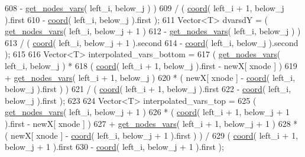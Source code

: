 \begin{DoxyCode}
608                               - \hyperlink{classLuna_1_1Mesh2D_ae91c7515960ecedf43e4ed3f411080a1}{get\_nodes\_vars}( left\_i, below\_j ) )
609                            / ( \hyperlink{classLuna_1_1Mesh2D_add4d12155922731ccf59fe4454699eed}{coord}( left\_i + 1, below\_j ).first
610                               - \hyperlink{classLuna_1_1Mesh2D_add4d12155922731ccf59fe4454699eed}{coord}( left\_i, below\_j ).first );
611         Vector<T> dvarsdY = ( \hyperlink{classLuna_1_1Mesh2D_ae91c7515960ecedf43e4ed3f411080a1}{get\_nodes\_vars}( left\_i, below\_j + 1 )
612                               - \hyperlink{classLuna_1_1Mesh2D_ae91c7515960ecedf43e4ed3f411080a1}{get\_nodes\_vars}( left\_i, below\_j ) )
613                            / ( \hyperlink{classLuna_1_1Mesh2D_add4d12155922731ccf59fe4454699eed}{coord}( left\_i, below\_j + 1 ).second
614                               - \hyperlink{classLuna_1_1Mesh2D_add4d12155922731ccf59fe4454699eed}{coord}( left\_i, below\_j ).second );
615 
616         Vector<T> interpolated\_vars\_bottom =
617                     ( \hyperlink{classLuna_1_1Mesh2D_ae91c7515960ecedf43e4ed3f411080a1}{get\_nodes\_vars}( left\_i, below\_j ) *
618                       ( \hyperlink{classLuna_1_1Mesh2D_add4d12155922731ccf59fe4454699eed}{coord}( left\_i + 1, below\_j ).first - newX[ xnode ] )
619                       + \hyperlink{classLuna_1_1Mesh2D_ae91c7515960ecedf43e4ed3f411080a1}{get\_nodes\_vars}( left\_i + 1, below\_j )
620                       * ( newX[ xnode ] - \hyperlink{classLuna_1_1Mesh2D_add4d12155922731ccf59fe4454699eed}{coord}( left\_i, below\_j ).first ) )
621                     / ( \hyperlink{classLuna_1_1Mesh2D_add4d12155922731ccf59fe4454699eed}{coord}( left\_i + 1, below\_j ).first
622                       - \hyperlink{classLuna_1_1Mesh2D_add4d12155922731ccf59fe4454699eed}{coord}( left\_i, below\_j ).first );
623 
624         Vector<T> interpolated\_vars\_top =
625           ( \hyperlink{classLuna_1_1Mesh2D_ae91c7515960ecedf43e4ed3f411080a1}{get\_nodes\_vars}( left\_i, below\_j + 1 )
626           * ( \hyperlink{classLuna_1_1Mesh2D_add4d12155922731ccf59fe4454699eed}{coord}( left\_i + 1, below\_j + 1 ).first - newX[ xnode ] )
627           + \hyperlink{classLuna_1_1Mesh2D_ae91c7515960ecedf43e4ed3f411080a1}{get\_nodes\_vars}( left\_i + 1, below\_j + 1 )
628           * ( newX[ xnode ] - \hyperlink{classLuna_1_1Mesh2D_add4d12155922731ccf59fe4454699eed}{coord}( left\_i, below\_j + 1 ).first ) ) /
629           ( \hyperlink{classLuna_1_1Mesh2D_add4d12155922731ccf59fe4454699eed}{coord}( left\_i + 1, below\_j + 1 ).first
630           - \hyperlink{classLuna_1_1Mesh2D_add4d12155922731ccf59fe4454699eed}{coord}( left\_i, below\_j + 1 ).first );

\end{DoxyCode}
